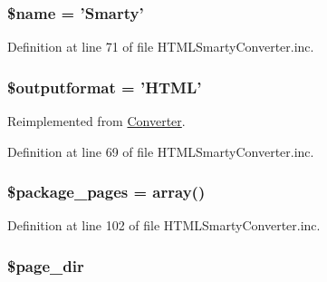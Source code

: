 \hypertarget{class_h_t_m_l_smarty_converter_ab2fc40d43824ea3e1ce5d86dee0d763b}{
\subsubsection[{\$name}]{\setlength{\rightskip}{0pt plus 5cm}\$name = '{\bf \-Smarty}'}}\label{class_h_t_m_l_smarty_converter_ab2fc40d43824ea3e1ce5d86dee0d763b}


\-Definition at line 71 of file \-H\-T\-M\-L\-Smarty\-Converter.\-inc.

\hypertarget{class_h_t_m_l_smarty_converter_af0bfe153c049d957e8ea29b147025108}{
\subsubsection[{\$outputformat}]{\setlength{\rightskip}{0pt plus 5cm}\$outputformat = '\-H\-T\-M\-L'}}\label{class_h_t_m_l_smarty_converter_af0bfe153c049d957e8ea29b147025108}


\-Reimplemented from \hyperlink{class_converter_af0bfe153c049d957e8ea29b147025108}{\-Converter}.



\-Definition at line 69 of file \-H\-T\-M\-L\-Smarty\-Converter.\-inc.

\hypertarget{class_h_t_m_l_smarty_converter_acb916db0304b969918dbc0de762d45e0}{
\subsubsection[{\$package\-\_\-pages}]{\setlength{\rightskip}{0pt plus 5cm}\$package\-\_\-pages = array()}}\label{class_h_t_m_l_smarty_converter_acb916db0304b969918dbc0de762d45e0}


\-Definition at line 102 of file \-H\-T\-M\-L\-Smarty\-Converter.\-inc.

\hypertarget{class_h_t_m_l_smarty_converter_ab554c658003c5e2653580ba881cd50eb}{
\subsubsection[{\$page\-\_\-dir}]{\setlength{\rightskip}{0pt plus 5cm}\$page\-\_\-dir}}\label{class_h_t_m_l_smarty_converter_ab554c658003c5e2653580ba881cd50eb}



